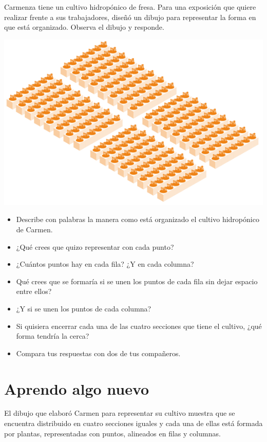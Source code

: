 \documentclass[10pt,twoside]{article}
\begin{document}
\begin{minipage}{0.25\textwidth}
Carmenza tiene un cultivo hidropónico de fresa. Para una exposición que quiere realizar frente a sus trabajadores, diseñó un dibujo para representar la forma en que está organizado. Observa el dibujo y responde.
\end{minipage}\hfill
\begin{minipage}{.75\textwidth}
\includegraphics[scale=.45]{Images/CultivHidrop.png}
\end{minipage}
\begin{itemize}
\item Describe con palabras la manera como está organizado el cultivo hidropónico de Carmen.
\item ¿Qué crees que quizo representar con cada punto?
\item ¿Cuántos puntos hay en cada fila? ¿Y en cada columna?
\item Qué crees que se formaría si se unen los puntos de cada fila sin dejar espacio entre ellos?
\item ¿Y si se unen los puntos de cada columna?
\item Si quisiera encerrar cada una de las cuatro secciones que tiene el cultivo, ¿qué forma tendría la cerca?
\item Compara tus respuestas con dos de tus compañeros.
\end{itemize}
\section*{Aprendo algo nuevo}
El dibujo que elaboró Carmen para representar su cultivo muestra que se encuentra distribuido en cuatro secciones iguales y cada una de ellas está formada por plantas, representadas con puntos, alineados en filas y columnas.
\end{document}
